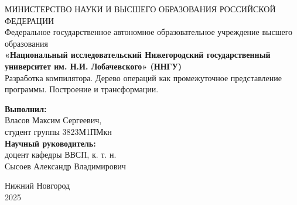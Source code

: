 \documentclass[a4paper,12pt]{extarticle}
\begin{document}
\begin{titlepage}
  \begin{center}
    МИНИСТЕРСТВО НАУКИ И ВЫСШЕГО ОБРАЗОВАНИЯ РОССИЙСКОЙ ФЕДЕРАЦИИ\\
    Федеральное государственное автономное образовательное учреждение высшего образования\\
    \textbf{«Национальный исследовательский Нижегородский государственный университет им. Н.И. Лобачевского» (ННГУ)}\\
    \vspace*{\fill}
    {\LARGE
      Разработка компилятора.
      Дерево операций как промежуточное представление программы.
      Построение и трансформации.
    }\\
    \vspace{2cm}
  \end{center}
  \hfill
  \begin{minipage}{0.45\textwidth}
    \raggedright
    \textbf{Выполнил:}\\
    Власов Максим Сергеевич,\\
    студент группы 3823М1ПМкн\\
    \vspace{1cm}
    \textbf{Научный руководитель:}\\
    доцент кафедры ВВСП, к. т. н.\\
    Сысоев Александр Владимирович
  \end{minipage}
  \vspace*{\fill}
  \begin{center}
    Нижний Новгород\\
    2025
  \end{center}
\end{titlepage}

\newpage
\setcounter{page}{2}
\tableofcontents











\newpage
{}
\printbibliography
\end{document}

